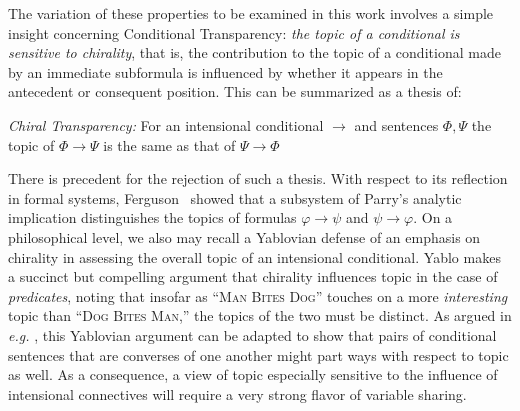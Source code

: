 \documentclass{amsart}
\theoremstyle{definition}
\begin{document}
The variation of these properties to be examined in this work involves a simple insight concerning Conditional Transparency: \emph{the topic of a conditional is sensitive to chirality}, that is, the contribution to the topic of a conditional made by an immediate subformula is influenced by whether it appears in the antecedent or consequent position. This can be summarized as a thesis of:

\vspace{.2cm}

\noindent\emph{Chiral Transparency:} For an intensional conditional $\rightarrow$ and sentences $\Phi,\Psi$ the topic of $\Phi\rightarrow\Psi$ is the same as that of $\Psi\rightarrow\Phi$

\vspace{.2cm}


\noindent There is precedent for the rejection of such a thesis. With respect to its reflection in formal systems, Ferguson~\citeyearpar{ferguson2024} showed that a subsystem of Parry's analytic implication distinguishes the topics of formulas $\varphi\rightarrow\psi$ and $\psi\rightarrow\varphi$. On a philosophical level, we also may recall a Yablovian defense of an emphasis on chirality in assessing the overall topic of an intensional conditional. Yablo \citeyearpar{yablo2014} makes a succinct but compelling argument that chirality influences topic in the case of \emph{predicates}, noting that insofar as ``\textsc{Man Bites Dog}'' touches on a more \emph{interesting} topic than ``\textsc{Dog Bites Man},'' the topics of the two must be distinct. As argued in \emph{e.g.} \cite{ferguson2023a,ferguson2023c}, this Yablovian argument can be adapted to show that pairs of conditional sentences that are converses of one another might part ways with respect to topic as well. As a consequence, a view of topic especially sensitive to the influence of intensional connectives will require a very strong flavor of variable sharing.
\end{document}
